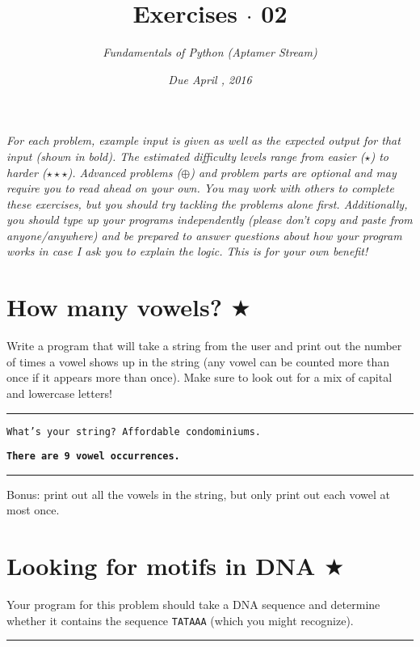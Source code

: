 \documentclass[12pt, letterpaper]{article}
\title{Exercises $\cdot$ 02}
\author{\textit{Fundamentals of Python (Aptamer Stream)}}
\date{\textit{Due April \nth{22}, 2016}}
\begin{document}
\maketitle
\textit{For each problem, example input is given as well as the expected output for that input (shown in bold). The estimated difficulty levels range from easier ($\star$) to harder ($\star\star\star$). Advanced problems ($\oplus$) and problem parts are optional and may require you to read ahead on your own. You may work with others to complete these exercises, but you should try tackling the problems alone first. Additionally, you should type up your programs independently (please don't copy and paste from anyone/anywhere) and be prepared to answer questions about how your program works in case I ask you to explain the logic. This is for your own benefit!}

\section{\upshape How many vowels? $\bigstar$}
Write a program that will take a string from the user and print out the number of times a vowel shows up in the string (any vowel can be counted more than once if it appears more than once). Make sure to look out for a mix of capital and lowercase letters!



\vspace{2mm}\hrule\vspace{2mm}

\texttt{What's your string? Affordable condominiums.}

\texttt{\bfseries There are 9 vowel occurrences.}

\vspace{2mm}\hrule\vspace{2mm}

Bonus: print out all the vowels in the string, but only print out each vowel at most once.

\section{\upshape Looking for motifs in DNA $\bigstar$}
Your program for this problem should take a DNA sequence and determine whether it contains the sequence \texttt{TATAAA} (which you might recognize).


\vspace{2mm}\hrule\vspace{2mm}
\end{document}
